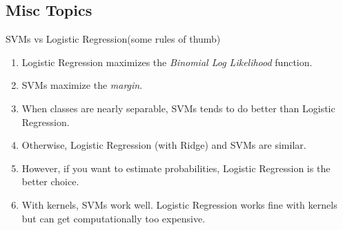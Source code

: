 \documentclass[xcolor=dvipsnames]{beamer}
\begin{document}
\subsection{Misc Topics}

\begin{frame}{SVMs vs Logistic Regression}{(some rules of thumb)}
    \begin{enumerate}
        \item Logistic Regression maximizes the {\em Binomial Log Likelihood} function.
        \item SVMs maximize the {\em margin}.
        \item When classes are nearly separable, SVMs tends to do better than Logistic Regression.
        \item Otherwise, Logistic Regression (with Ridge) and SVMs are similar.
        \item However, if you want to estimate probabilities, Logistic Regression is the better choice.
        \item With kernels, SVMs work well. Logistic Regression works fine with kernels but can get computationally too expensive.
    \end{enumerate}
\end{frame}
\end{document}
